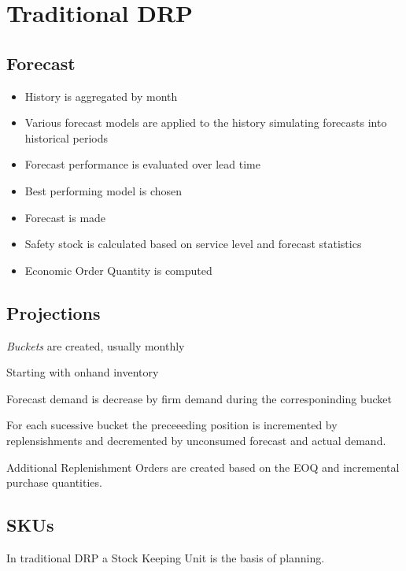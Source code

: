 \documentclass[letterpaper,10pt,english]{sphinxmanual}
\begin{document}
\section{Traditional DRP}
\label{BusinessProcessReengineering:traditional-drp}

\subsection{Forecast}
\label{BusinessProcessReengineering:forecast}\begin{itemize}
\item {} 
History is aggregated by month

\item {} 
Various forecast models are applied to the history simulating
forecasts into historical periods

\item {} 
Forecast performance is evaluated over lead time

\item {} 
Best performing model is chosen

\item {} 
Forecast is made

\item {} 
Safety stock is calculated based on service level and forecast
statistics

\item {} 
Economic Order Quantity is computed

\end{itemize}


\subsection{Projections}
\label{BusinessProcessReengineering:projections}
\emph{Buckets} are created, usually monthly

Starting with onhand inventory

Forecast demand is decrease by firm demand during the corresponinding
bucket

For each sucessive bucket the preceeeding position is incremented by
replensishments and decremented by unconsumed forecast and actual
demand.

Additional Replenishment Orders are created based on the EOQ and
incremental purchase quantities.


\subsection{SKUs}
\label{BusinessProcessReengineering:skus}
In traditional DRP a Stock Keeping Unit is the basis of planning.
\end{document}
